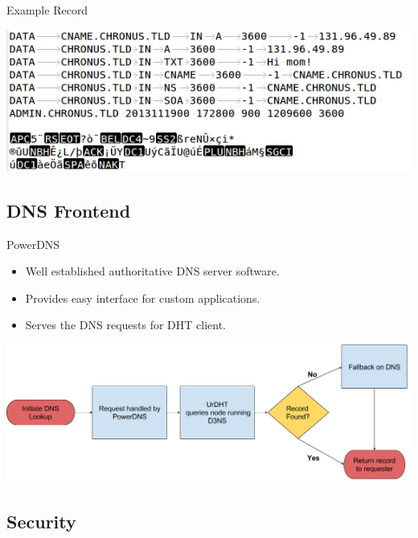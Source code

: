 \documentclass[11pt]{beamer}
\begin{document}
\begin{frame}{Example Record}
	\begin{center}
\includegraphics[width=0.7\linewidth]{figs/record}
\end{center}

\end{frame}



\subsection{DNS Frontend}
\begin{frame}{PowerDNS}
\begin{itemize}
	\item Well established authoritative DNS server software.	
	\item Provides easy interface for custom applications.
	\item Serves the DNS requests for DHT client.
\end{itemize}

	\begin{center}
		\includegraphics[width=\linewidth]{"figs/D3NS Flowchart"}
	\end{center}


	

	
\end{frame}



\subsection{Security}
\end{document}

